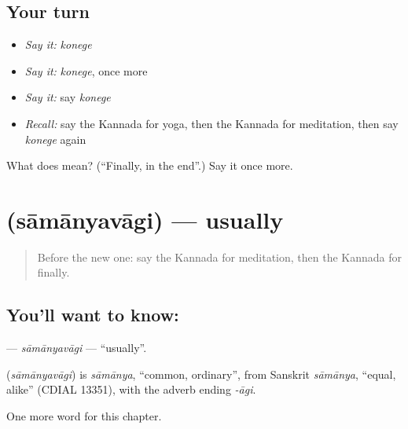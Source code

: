 \subsection*{Your turn}
\begin{itemize}
\raggedright
  \item \emph{Say it:} \emph{konege}
  \item \emph{Say it:} \emph{konege}, once more
  \item \emph{Say it:} say \emph{konege}
  \item \emph{Recall:} say the Kannada for yoga, then the Kannada for meditation, then say \emph{konege} again
\end{itemize}

\begin{tcolorbox}[breakable,colback=teal!4,colframe=teal!35!black,title={Before you move on}]
What does  mean? (\textquotedblleft{}Finally, in the end\textquotedblright{}.) Say it once more.
\end{tcolorbox}
\section[\texorpdfstring{\kn{ಸಾಮಾನ್ಯವಾಗಿ} (sāmānyavāgi)}{ಸಾಮಾನ್ಯವಾಗಿ (sāmānyavāgi)}]{ (sāmānyavāgi) — usually}

\label{lesson:KA-C210-samanyavagi}



\begin{quote}
Before the new one: say the Kannada for meditation, then the Kannada for finally.
\end{quote}

\subsection*{You'll want to know: }
\textbf{} — \emph{sāmānyavāgi} — \textquotedblleft{}usually\textquotedblright{}.

\begin{cousinweb}
\textbf{} (\emph{sāmānyavāgi}) is \emph{sāmānya}, \textquotedblleft{}common, ordinary\textquotedblright{}, from Sanskrit \emph{sāmānya}, \textquotedblleft{}equal, alike\textquotedblright{} (CDIAL 13351), with the adverb ending \emph{-āgi}.
\end{cousinweb}

\begin{grammarlens}[title={What you've built}]
One more word for this chapter.
\end{grammarlens}

